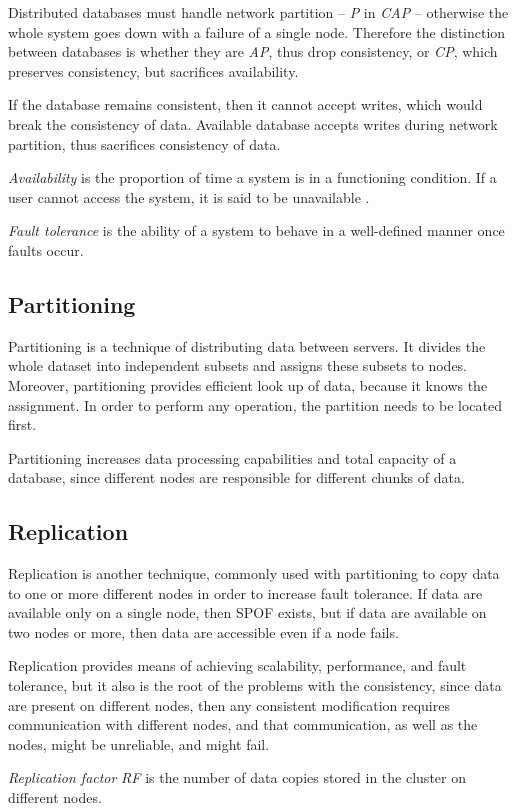 Distributed databases must handle network partition -- \emph{P} in \emph{CAP} -- otherwise the whole system goes down with a failure of a single node. Therefore the distinction between databases is whether they are \emph{AP}, thus drop consistency, or \emph{CP}, which preserves consistency, but sacrifices availability.

If the database remains consistent, then it cannot accept writes, which would break the consistency of data. Available database accepts writes during network partition, thus sacrifices consistency of data.

\begin{definition}
	\label{def:availability}
	\emph{Availability} is the proportion of time a system is in a functioning condition. If a user cannot access the system, it is said to be unavailable \cite{DistributeSystemsForFunAndProfit}.	
\end{definition}


\begin{definition}
\label{def:fault-tolerance}
\emph{Fault tolerance} is the ability of a system to behave in a well-defined manner once faults occur. 
\end{definition}

\subsection{Partitioning}
Partitioning is a technique of distributing data between servers. 
It divides the whole dataset into independent subsets and assigns these subsets to nodes. 
Moreover, partitioning provides efficient look up of data, because it knows the assignment. In order to perform any operation, the partition needs to be located first. 

Partitioning increases data processing capabilities and total capacity of a database, since different nodes are responsible for different chunks of data. 

\subsection{Replication}
Replication is another technique, commonly used with partitioning to copy data to one or more different nodes in order to increase fault tolerance. If data are available only on a single node, then SPOF exists, but if data are available on two nodes or more, then data are accessible even if a node fails. 

Replication provides means of achieving scalability, performance, and fault tolerance, but it also is the root of the problems with the consistency, since data are present on different nodes, then any consistent modification requires communication with different nodes, and that communication, as well as the nodes, might be unreliable, and might fail. 

\begin{definition}
  \label{def:replicationFactor}
  \emph{Replication factor} \emph{RF} is the number of data copies stored in the cluster on different nodes.
\end{definition}


